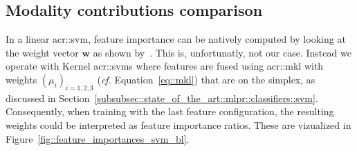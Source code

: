     \subsection{Modality contributions comparison}
        \label{subsec::more_experiments::classifier::feature_importance}
        In a linear \gls{acr::svm}, feature importance can be natively computed by looking at the weight vector \(\bm{w}\) as shown by~\textcite{guyon2002gene}.
        This is, unfortunatly, not our case.
        Instead we operate with Kernel \glspl{acr::svm} where features are fused using \gls{acr::mkl} with weights \(\left(\mu_i\right)_{i=1, 2, 3}\) (\textit{cf.} Equation~\ref{eq::mkl}) that are on the simplex, as discussed in Section~\ref{subsubsec::state_of_the_art::mlpr::classifiers::svm}.
        Consequently, when training with the last feature configuration, the resulting weights could be interpreted as feature importance ratios.
        These are vizualized in Figure~\ref{fig::feature_importances_svm_bl}.\\

        \begin{figure}[htpb]
            \centering
        \end{figure}

